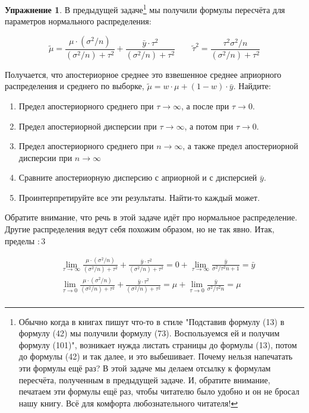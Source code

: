 \documentclass[12pt, a4paper, oneside]{extreport}
\theoremstyle{plain}              %
\theoremstyle{definition}         %
\newtheorem{problem}{\color{myblue} Упражнение}
\begin{document}
\begin{problem}\label{upr_predel}
В предыдущей задаче\footnote{Обычно когда в книгах пишут что-то в стиле "Подставив формулу (13) в формулу (42) мы получили формулу (73). Воспользуемся ей и получим формулу (101)",  возникает нужда листать страницы до формулы (13), потом до формулы (42) и так далее, и это выбешивает. Почему нельзя напечатать эти формулы ещё раз? В этой задаче мы делаем отсылку к формулам пересчёта, полученным в предыдущей задаче. И, обратите внимание, печатаем эти формулы ещё раз, чтобы читателю было удобно и он не бросал нашу книгу. Всё для комфорта любознательного читателя!}  мы получили формулы пересчёта для параметров нормального распределения:

\[ \tilde \mu = \frac{\mu \cdot (\sigma^2/n)}{(\sigma^2/n) + \tau^2} + \frac{\bar y \cdot \tau^2}{(\sigma^2/n) + \tau^2}  \qquad \tilde \tau^2 = \frac{\tau^2 \sigma^2/n}{(\sigma^2/n) + \tau^2} \]

Получается, что апостериорное среднее это взвешенное среднее априорного распределения  и среднего по выборке, $\tilde \mu = w \cdot \mu + (1 - w) \cdot \bar{y}$. Найдите:

\begin{enumerate}
\item Предел апостериорного среднего при $\tau \to \infty$, а после при $\tau \to 0$. 
\item Предел апостериорной дисперсии при $\tau \to \infty$, а потом  при $\tau \to 0$.
\item Предел апостериорного среднего при $n \to \infty$, а также предел апостериорной дисперсии при $n \to \infty$
\item Сравните апостериорную дисперсию с априорной и с дисперсией $\bar y$.
\item Проинтерпретируйте все эти результаты. Найти-то каждый может.
\end{enumerate}

\begin{sol}
Обратите внимание, что речь в этой задаче идёт про нормальное распределение. Другие распределения ведут себя похожим образом, но не так явно. Итак, пределы $:3$

\begin{align*}
&\lim_{\tau \to \infty} \frac{\mu \cdot (\sigma^2/n)}{(\sigma^2/n) + \tau^2} + \frac{\bar y \cdot \tau^2}{(\sigma^2/n) + \tau^2} = 0 + \lim_{\tau \to \infty} \frac{\bar y}{\sigma^2/\tau^2 n + 1} = \bar y \\
&\lim_{\tau \to 0} \frac{\mu \cdot (\sigma^2/n)}{(\sigma^2/n) + \tau^2} + \frac{\bar y \cdot \tau^2}{(\sigma^2/n) + \tau^2} = \mu + \lim_{\tau \to 0} \frac{\bar y}{\sigma^2/\tau^2 n} = \mu  \\
\end{align*}


\end{sol}
\end{problem}
\end{document}
